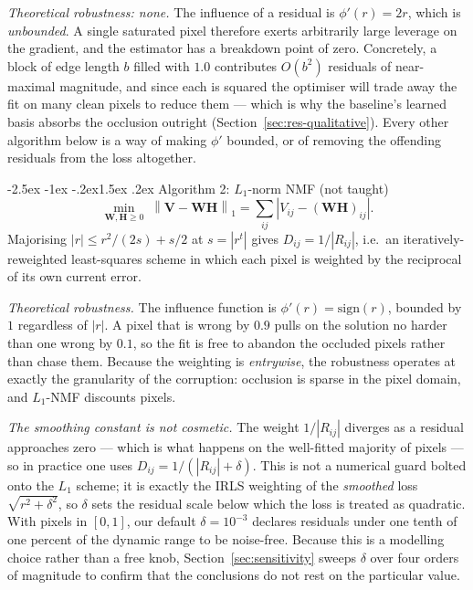 \documentclass[12pt,a4paper]{article}
\makeatletter
\renewcommand\subsection{\@startsection{subsection}{2}{\z@}%
    {-2.5ex \@plus -1ex \@minus -.2ex}{1.5ex \@plus.2ex}%
    {\normalfont\fontsize{12}{14}\bfseries}}
\newcommand{\bV}{\bm{V}}
\newcommand{\bW}{\bm{W}}
\newcommand{\bH}{\bm{H}}
\newcommand{\Lone}[1]{\left\lVert #1 \right\rVert_1}
\makeatother
\begin{document}
\emph{Theoretical robustness: none.} The influence of a residual is
$\phi'(r) = 2r$, which is \emph{unbounded}. A single saturated pixel therefore
exerts arbitrarily large leverage on the gradient, and the estimator has a
breakdown point of zero. Concretely, a block of edge length $b$ filled with
$1.0$ contributes $O(b^{2})$ residuals of near-maximal magnitude, and since
each is squared the optimiser will trade away the fit on many clean pixels to
reduce them --- which is why the baseline's learned basis absorbs the
occlusion outright (Section~\ref{sec:res-qualitative}). Every other algorithm
below is a way of making $\phi'$ bounded, or of removing the offending
residuals from the loss altogether.

\subsection{Algorithm 2: $L_1$-norm NMF (not taught)}
\begin{equation}
  \min_{\bW,\bH \ge 0} \; \Lone{\bV - \bW\bH}
  = \sum_{ij} \left| V_{ij} - (\bW\bH)_{ij} \right| .
\end{equation}
Majorising $|r| \le r^{2}/(2s) + s/2$ at $s = |r^{t}|$ gives
$D_{ij} = 1/|R_{ij}|$, i.e.\ an iteratively-reweighted least-squares scheme in
which each pixel is weighted by the reciprocal of its own current error.

\emph{Theoretical robustness.} The influence function is
$\phi'(r) = \mathrm{sign}(r)$, bounded by $1$ regardless of $|r|$. A pixel
that is wrong by $0.9$ pulls on the solution no harder than one wrong by
$0.1$, so the fit is free to abandon the occluded pixels rather than chase
them. Because the weighting is \emph{entrywise}, the robustness operates at
exactly the granularity of the corruption: occlusion is sparse in the pixel
domain, and $L_1$-NMF discounts pixels.

\emph{The smoothing constant is not cosmetic.} The weight $1/|R_{ij}|$
diverges as a residual approaches zero --- which is what happens on the
well-fitted majority of pixels --- so in practice one uses
$D_{ij} = 1/(|R_{ij}| + \delta)$. This is not a numerical guard bolted onto
the $L_1$ scheme; it is exactly the IRLS weighting of the \emph{smoothed} loss
$\sqrt{r^{2}+\delta^{2}}$, so $\delta$ sets the residual scale below which the
loss is treated as quadratic. With pixels in $[0,1]$, our default
$\delta = 10^{-3}$ declares residuals under one tenth of one percent of the
dynamic range to be noise-free. Because this is a modelling choice rather than
a free knob, Section~\ref{sec:sensitivity} sweeps $\delta$ over four orders
of magnitude to confirm that the conclusions do not rest on the particular
value.
\end{document}
